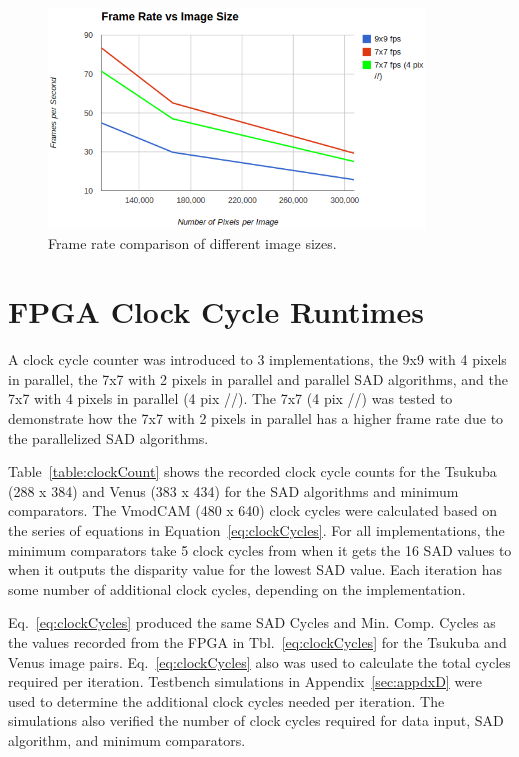 \begin{figure}[h]
	\begin{center}
		\includegraphics[width=100mm]{figures/frameRate.png}
		\captionfonts
		\caption{Frame rate comparison of different image sizes.}
		\label{fig:frameRate}
	\end{center}
\end{figure}

\section{FPGA Clock Cycle Runtimes}

A clock cycle counter was introduced to 3 implementations, the 9x9 with 4 pixels in parallel, the 7x7 with 2 pixels in parallel and parallel SAD algorithms, and the 7x7 with 4 pixels in parallel (4 pix //). The 7x7 (4 pix //) was tested to demonstrate how the 7x7 with 2 pixels in parallel has a higher frame rate due to the parallelized SAD algorithms. 

Table~\ref{table:clockCount} shows the recorded clock cycle counts for the Tsukuba (288 x 384) and Venus (383 x 434) for the SAD algorithms and minimum comparators. The VmodCAM (480 x 640) clock cycles were calculated based on the series of equations in Equation~\ref{eq:clockCycles}. For all implementations, the minimum comparators take 5 clock cycles from when it gets the 16 SAD values to when it outputs the disparity value for the lowest SAD value. Each iteration has some number of additional clock cycles, depending on the implementation.

Eq.~\ref{eq:clockCycles} produced the same SAD Cycles and Min. Comp. Cycles as the values recorded from the FPGA in Tbl.~\ref{eq:clockCycles} for the Tsukuba and Venus image pairs. Eq.~\ref{eq:clockCycles} also was used to calculate the total cycles required per iteration. Testbench simulations in Appendix~\ref{sec:appdxD} were used to determine the additional clock cycles needed per iteration. The simulations also verified the number of clock cycles required for data input, SAD algorithm, and minimum comparators.

